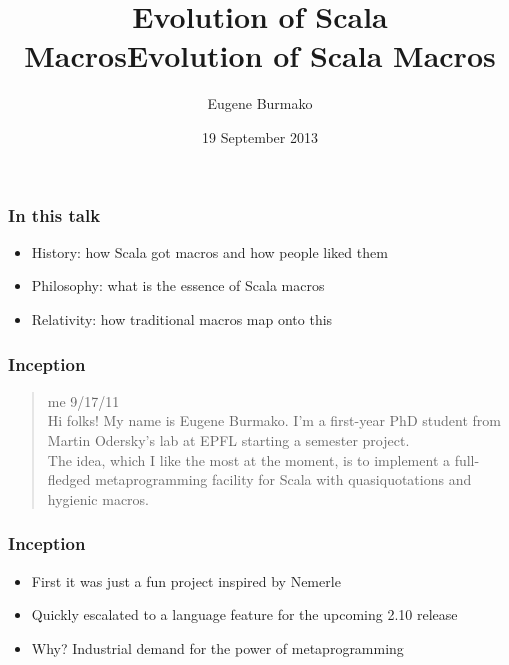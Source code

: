 \documentclass[svgnames,hyperref={bookmarks=false}]{beamer}
\title{Evolution of Scala Macros}
\begin{document}
\title{Evolution of Scala Macros}
\author{Eugene Burmako}
\date{19 September 2013}
{
\begin{frame}
  \titlepage
\end{frame}
}

\begin{frame}[fragile]
\frametitle{In this talk}

\begin{itemize}
\item History: how Scala got macros and how people liked them
\item Philosophy: what is the essence of Scala macros
\item Relativity: how traditional macros map onto this
\end{itemize}
\end{frame}

\begin{frame}[fragile]
\frametitle{}

\vskip40pt
\begin{center}
\end{center}
\end{frame}

\begin{frame}[fragile]
\frametitle{Inception}

\begin{quote}
me 9/17/11\\
\vskip10pt
Hi folks! My name is Eugene Burmako. I'm a first-year PhD student from Martin Odersky's lab at EPFL
starting a semester project.\\
\vskip10pt
The idea, which I like the most at the moment, is to implement
a full-fledged metaprogramming facility for Scala with quasiquotations and hygienic macros.
\end{quote}
\end{frame}

\begin{frame}[fragile]
\frametitle{Inception}

\begin{itemize}
\item First it was just a fun project inspired by Nemerle
\item Quickly escalated to a language feature for the upcoming 2.10 release
\item Why? Industrial demand for the power of metaprogramming
\end{itemize}
\end{frame}
\end{document}
